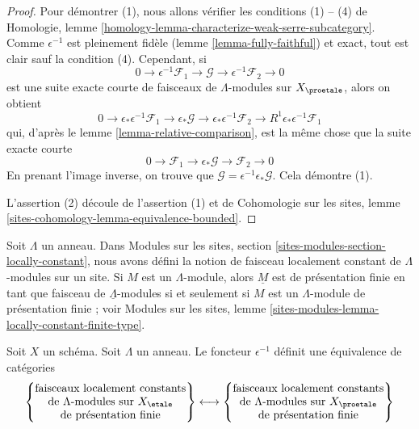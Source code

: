 \begin{proof}
Pour démontrer (1), nous allons vérifier les conditions (1) -- (4) de
Homologie, lemme \ref{homology-lemma-characterize-weak-serre-subcategory}.
Comme $\epsilon^{-1}$ est pleinement fidèle (lemme \ref{lemma-fully-faithful})
et exact, tout est clair sauf la condition (4).
Cependant, si
$$
0 \to \epsilon^{-1}\mathcal{F}_1 \to \mathcal{G} \to
\epsilon^{-1}\mathcal{F}_2 \to 0
$$
est une suite exacte courte de faisceaux de $\Lambda$-modules sur $X_\proetale$,
alors on obtient
$$
0 \to \epsilon_*\epsilon^{-1}\mathcal{F}_1 \to \epsilon_*\mathcal{G} \to
\epsilon_*\epsilon^{-1}\mathcal{F}_2 \to
R^1\epsilon_*\epsilon^{-1}\mathcal{F}_1
$$
qui, d'après le lemme \ref{lemma-relative-comparison},
est la même chose que la suite exacte courte
$$
0 \to \mathcal{F}_1 \to \epsilon_*\mathcal{G} \to \mathcal{F}_2 \to 0
$$
En prenant l'image inverse, on trouve que $\mathcal{G} = \epsilon^{-1}\epsilon_*\mathcal{G}$.
Cela démontre (1).

\medskip\noindent
L'assertion (2) découle de l'assertion (1) et de Cohomologie sur les sites,
lemme \ref{sites-cohomology-lemma-equivalence-bounded}.
\end{proof}

\noindent
Soit $\Lambda$ un anneau. Dans
Modules sur les sites, section \ref{sites-modules-section-locally-constant},
nous avons défini la notion de faisceau localement constant de $\Lambda$-modules
sur un site. Si $M$ est un $\Lambda$-module, alors $\underline{M}$ est de
présentation finie en tant que faisceau de $\underline{\Lambda}$-modules si et seulement
si $M$ est un $\Lambda$-module de présentation finie ; voir
Modules sur les sites, lemme \ref{sites-modules-lemma-locally-constant-finite-type}.

\begin{lemma}
\label{lemma-compare-locally-constant}
Soit $X$ un schéma. Soit $\Lambda$ un anneau.
Le foncteur $\epsilon^{-1}$ définit une équivalence de catégories
$$
\left\{
\begin{matrix}
\text{faisceaux localement constants}\\
\text{de }\Lambda\text{-modules sur }X_\etale\\
\text{de présentation finie}
\end{matrix}
\right\}
\longleftrightarrow
\left\{
\begin{matrix}
\text{faisceaux localement constants}\\
\text{de }\Lambda\text{-modules sur }X_\proetale\\
\text{de présentation finie}
\end{matrix}
\right\}
$$
\end{lemma}

